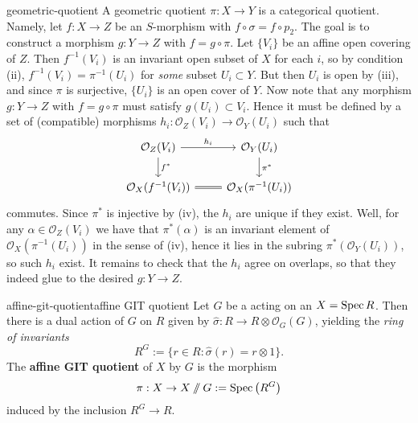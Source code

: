 \begin{example}{geometric-quotient}
    A geometric quotient $\pi : X \to Y$ is a categorical quotient. Namely, let $f : X \to Z$ be an $S$-morphism with $f \circ \sigma = f \circ p_2$. The goal is to construct a morphism $g : Y \to Z$ with $f = g \circ \pi$. Let $\{ V_i \}$ be an affine open covering of $Z$. Then $f^{-1}(V_i)$ is an invariant open subset of $X$ for each $i$, so by condition (ii), $f^{-1}(V_i) = \pi^{-1}(U_i)$ for \textit{some} subset $U_i \subset Y$. But then $U_i$ is open by (iii), and since $\pi$ is surjective, $\{ U_i \}$ is an open cover of $Y$. Now note that any morphism $g : Y \to Z$ with $f = g \circ \pi$ must satisfy $g(U_i) \subset V_i$. Hence it must be defined by a set of (compatible) morphisms $h_i : \mathcal{O}_Z(V_i) \to \mathcal{O}_Y(U_i)$ such that
    \[ \begin{tikzcd} \mathcal{O}_Z(V_i) \arrow{r}{h_i} \arrow{d}{f^*} & \mathcal{O}_Y(U_i) \arrow{d}{\pi^*} \\ \mathcal{O}_X(f^{-1}(V_i)) \arrow[equal]{r} & \mathcal{O}_X(\pi^{-1}(U_i)) \end{tikzcd} \]
    commutes. Since $\pi^*$ is injective by (iv), the $h_i$ are unique if they exist. Well, for any $\alpha \in \mathcal{O}_Z(V_i)$ we have that $\pi^*(\alpha)$ is an invariant element of $\mathcal{O}_X(\pi^{-1}(U_i))$ in the sense of (iv), hence it lies in the subring $\pi^*(\mathcal{O}_Y(U_i))$, so such $h_i$ exist.
    It remains to check that the $h_i$ agree on overlaps, so that they indeed glue to the desired $g : Y \to Z$.
\end{example}

\begin{topic}{affine-git-quotient}{affine GIT quotient}
    Let $G$ be a   acting on an  $X = \operatorname{Spec} R$. Then there is a dual action of $G$ on $R$ given by $\widehat{\sigma} : R \to R \otimes \mathcal{O}_G(G)$, yielding the \textit{ring of invariants}
    \[ R^G := \{ r \in R : \widehat{\sigma}(r) = r \otimes 1 \} . \]
    The \textbf{affine GIT quotient} of $X$ by $G$ is the morphism
    \[ \pi : X \to X \sslash G := \operatorname{Spec}\left(R^G\right) \]
    induced by the inclusion $R^G \to R$.
\end{topic}

